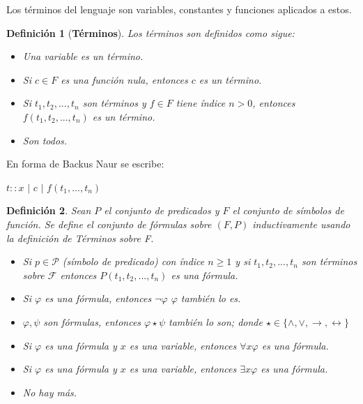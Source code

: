 \documentclass[letterpaper,11pt]{article}
\newtheorem{teo}{Definición}[]
\begin{document}
\begin{enumerate}
\begin{itemize}
            Los términos del lenguaje son variables, constantes y funciones aplicados
            a estos.
            \begin{teo}[\textbf{Términos}]
                Los términos son definidos como sigue:
                \begin{itemize}
                    \item Una variable es un término.
                    \item Si $c \in F$ es una función nula, entonces $c$ es un término.
                    \item Si $t_{1}, t_{2}, ..., t_{n}$ son términos y $f \in F$ tiene
                    índice $n > 0$, entonces $f(t_{1}, t_{2}, ..., t_{n})$ es un término.
                    \item Son todos.
                \end{itemize}
            \end{teo}

            En forma de Backus Naur se escribe:
            \begin{center}
                $t :: x$ $|$ $c$ $|$ $f(t_{1},...,t_{n})$
            \end{center}

            \begin{teo}
                Sean $P$ el conjunto de predicados y $F$ el conjunto de símbolos de 
                función. Se define el conjunto de fórmulas sobre $(F, P)$
                inductivamente usando la definición de Términos sobre F.
                \begin{itemize}
                    \item Si $p \in \mathcal{P}$ (símbolo de predicado) con 
                    índice $n \geq 1$ y si $t_{1}, t_{2}, ..., t_{n}$ son términos
                    sobre $\mathcal{F}$ entonces $P(t_{1}, t_{2},..., t_{n})$ es 
                    una fórmula. 
                    \item Si $\varphi$ es una fórmula, entonces $\neg \varphi$ 
                    $\varphi$ también lo es.
                    \item $\varphi, \psi$ son fórmulas, entonces 
                    $\varphi \star \psi$ también lo son; donde 
                    $\star \in \{ \land, \lor, \rightarrow, \leftrightarrow \}$ 
                    \item Si $\varphi$ es una fórmula y $x$ es una variable, 
                    entonces $\forall x \varphi$ es una fórmula.
                    \item Si $\varphi$ es una fórmula y $x$ es una variable,
                    entonces $\exists x \varphi$ es una fórmula.
                    \item No hay más.
                \end{itemize}


\end{teo}
\end{itemize}
\end{enumerate}
\end{document}
